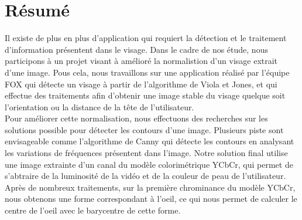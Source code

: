 \section*{Résumé}
Il existe de plus en plus d'application qui requiert la détection et le traitement d'information
présentent dans le visage. Dans le cadre de nos étude, nous participons à un projet visant
à amélioré la normalistion d'un visage extrait d'une image. Pous cela, nous travaillons
sur une application réalisé par l'équipe FOX qui détecte un visage à partir de l'algorithme de
Viola et Jones, et qui effectue des traitements afin d'obtenir une image stable du visage
quelque soit l'orientation ou la distance de la tête de l'utilisateur.\\

Pour améliorer cette normalisation, nous effectuons des recherches sur les solutions possible
pour détecter les contours d'une image. Plusieurs piste sont envisageable comme l'algorithme de
Canny qui détecte les contours en analysant les variations de fréquences présentent dans l'image.
Notre solution final utilise une image extrainte d'un canal du modèle colorimétrique YCbCr, qui permet
de s'abtraire de la luminosité de la vidéo et de la couleur de peau de l'utilisateur.\\

Après de nombreux traitements, sur la première chrominance du modèle YCbCr, nous obtenons une forme
correspondant à l'oeil, ce qui nous permet de calculer le centre de l'oeil avec le barycentre de 
cette forme.


\newpage